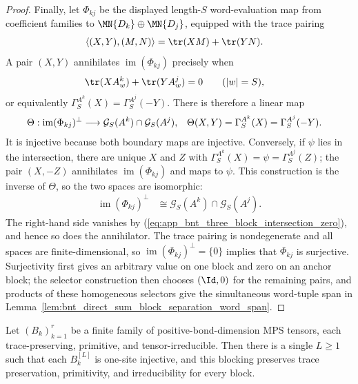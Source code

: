 \begin{proof}
    Finally, let $\Phi_{kj}$ be the displayed length-$S$ word-evaluation map
    from coefficient families to $\MN{D_k}\oplus\MN{D_j}$, equipped with the
    trace pairing
    \begin{align}
        \langle (X,Y),(M,N)\rangle
         & =\tr(XM)+\tr(YN).
        \notag
    \end{align}
    A pair $(X,Y)$ annihilates $\operatorname{im}(\Phi_{kj})$ precisely when
    \begin{align}
        \tr(XA^k_w)+\tr(YA^j_w) & =0
        \qquad (|w|=S),
        \notag
    \end{align}
    or equivalently
    $\Gamma_S^{A^k}(X)=\Gamma_S^{A^j}(-Y)$. There is therefore a linear map
    \begin{align}
        \Theta:\operatorname{im}(\Phi_{kj})^\perp
         & \longrightarrow
        \mathcal G_S(A^k)\cap\mathcal G_S(A^j),
         &
        \Theta(X,Y)
         & =\Gamma_S^{A^k}(X)=\Gamma_S^{A^j}(-Y).
        \notag
    \end{align}
    It is injective because both boundary maps are injective. Conversely, if
    $\psi$ lies in the intersection, there are unique $X$ and $Z$ with
    $\Gamma_S^{A^k}(X)=\psi=\Gamma_S^{A^j}(Z)$; the pair $(X,-Z)$ annihilates
    $\operatorname{im}(\Phi_{kj})$ and maps to $\psi$. This construction is
    the inverse of $\Theta$, so the two spaces are isomorphic:
    \begin{align}
        \operatorname{im}(\Phi_{kj})^\perp
         & \cong\mathcal G_S(A^k)\cap\mathcal G_S(A^j).
        \label{eq:app_bnt_pair_map_annihilator}
    \end{align}
    The right-hand side vanishes by
    (\ref{eq:app_bnt_three_block_intersection_zero}), and hence so does the
    annihilator. The trace pairing is nondegenerate and all spaces are
    finite-dimensional, so
    $\operatorname{im}(\Phi_{kj})^\perp=\{0\}$ implies that $\Phi_{kj}$ is
    surjective. Surjectivity first gives an arbitrary value on one block and
    zero on an anchor block; the selector construction then chooses
    $(\Id,0)$ for the remaining pairs, and products of these homogeneous
    selectors give the simultaneous word-tuple span in
    Lemma~\ref{lem:bnt_direct_sum_block_separation_word_span}.
\end{proof}

\begin{lemma}%
    \label{thm:common_injective_blocking_tp_primitive_irreducible_family}
    \leanok
    Let $(B_k)_{k=1}^r$ be a finite family of positive-bond-dimension MPS tensors,
    each trace-preserving, primitive, and tensor-irreducible. Then there is a
    single $L\ge 1$ such that each $B_k^{[L]}$ is one-site injective, and this
    blocking preserves trace preservation, primitivity, and irreducibility for
    every block.
\end{lemma}

